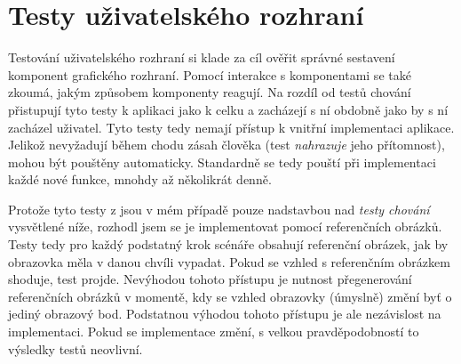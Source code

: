 \section{Testy uživatelského rozhraní}\label{testovani-ui}

Testování uživatelského rozhraní si klade za cíl ověřit správné sestavení komponent grafického rozhraní.
Pomocí interakce s komponentami se také zkoumá, jakým způsobem komponenty reagují.
Na rozdíl od testů chování přistupují tyto testy k aplikaci jako k celku a zacházejí s ní obdobně jako by s ní zacházel uživatel. Tyto testy tedy nemají přístup k vnitřní implementaci aplikace.
Jelikož nevyžadují během chodu zásah člověka (test \textit{nahrazuje} jeho přítomnost), mohou být pouštěny automaticky.
Standardně se tedy pouští při implementaci každé nové funkce, mnohdy až několikrát denně. \cite{apple-ui-testing}

Protože tyto testy z jsou v mém případě pouze nadstavbou nad \textit{testy chování} vysvětlené níže, rozhodl jsem se je implementovat pomocí referenčních obrázků.
Testy tedy pro každý podstatný krok scénáře obsahují referenční obrázek, jak by obrazovka měla v danou chvíli vypadat.
Pokud se vzhled s referenčním obrázkem shoduje, test projde.
Nevýhodou tohoto přístupu je nutnost přegenerování referenčních obrázků v momentě, kdy se vzhled obrazovky (úmyslně) změní byť o jediný obrazový bod.
Podstatnou výhodou tohoto přístupu je ale nezávislost na implementaci.
Pokud se implementace změní, s velkou pravděpodobností to výsledky testů neovlivní.